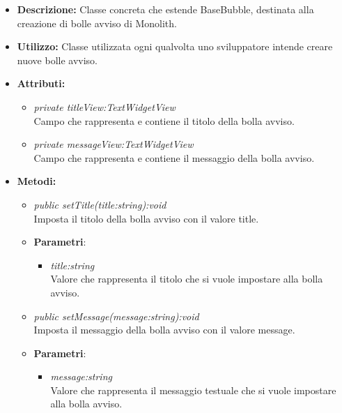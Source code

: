 \begin{itemize}
\item \textbf{Descrizione:} Classe concreta che estende BaseBubble, destinata alla creazione di bolle avviso di Monolith.
\item \textbf{Utilizzo:} Classe utilizzata ogni qualvolta uno sviluppatore intende creare nuove bolle avviso.
\item \textbf{Attributi:} 
\begin{itemize}
\item \textit{private titleView:TextWidgetView}\\
Campo che rappresenta e contiene il titolo della bolla avviso.
\item \textit{private messageView:TextWidgetView}\\
Campo che rappresenta e contiene il messaggio della bolla avviso.
\end{itemize}
\item \textbf{Metodi:}
\begin{itemize}
\item \textit{public setTitle(title:string):void}\\
Imposta il titolo della bolla avviso con il valore title.
\item{\textbf{Parametri}: \begin{itemize}
\item \textit{title:string}\\
Valore che rappresenta il titolo che si vuole impostare alla bolla avviso.
\end{itemize}}
\item \textit{public setMessage(message:string):void}\\
Imposta il messaggio della bolla avviso con il valore message.
\item{\textbf{Parametri}: \begin{itemize}
\item \textit{message:string}\\
Valore che rappresenta il messaggio testuale che si vuole impostare alla bolla avviso.
\end{itemize}}
\end{itemize}
\end{itemize}